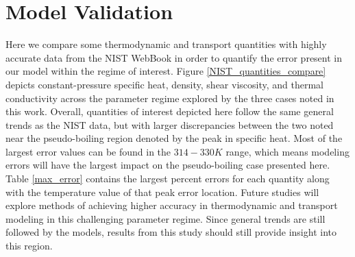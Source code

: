 \section{Model Validation}
Here we compare some thermodynamic and transport quantities with highly accurate data from the NIST WebBook \cite{NIST} in order to quantify the error present in our model within the regime of interest. Figure \ref{NIST_quantities_compare} depicts constant-pressure specific heat, density, shear viscosity, and thermal conductivity across the parameter regime explored by the three cases noted in this work. Overall, quantities of interest depicted here follow the same general trends as the NIST data, but with larger discrepancies between the two noted near the pseudo-boiling region denoted by the peak in specific heat. Most of the largest error values can be found in the $314-330K$ range, which means modeling errors will have the largest impact on the pseudo-boiling case presented here. Table \ref{max_error} contains the largest percent errors for each quantity along with the temperature value of that peak error location. Future studies will explore methods of achieving higher accuracy in thermodynamic and transport modeling in this challenging parameter regime. Since general trends are still followed by the models, results from this study should still provide insight into this region.
